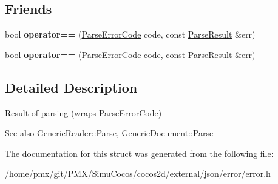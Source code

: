 \subsection*{Friends}
\begin{DoxyCompactItemize}
\item 
\mbox{\label{structParseResult_a58c9982e833d1c74686506ac7449200c}} 
bool {\bfseries operator==} (\hyperlink{group__RAPIDJSON__ERRORS_ga8d4b32dfc45840bca189ade2bbcb6ba7}{Parse\+Error\+Code} code, const \hyperlink{structParseResult}{Parse\+Result} \&err)
\item 
\mbox{\label{structParseResult_a58c9982e833d1c74686506ac7449200c}} 
bool {\bfseries operator==} (\hyperlink{group__RAPIDJSON__ERRORS_ga8d4b32dfc45840bca189ade2bbcb6ba7}{Parse\+Error\+Code} code, const \hyperlink{structParseResult}{Parse\+Result} \&err)
\end{DoxyCompactItemize}


\subsection{Detailed Description}
Result of parsing (wraps Parse\+Error\+Code) 


 \begin{DoxySeeAlso}{See also}
\hyperlink{classGenericReader_a0c450620d14ff1824e58bb7bd9b42099}{Generic\+Reader\+::\+Parse}, \hyperlink{classGenericDocument_aebd4e7fddd80c1e1174837aee6d2159b}{Generic\+Document\+::\+Parse} 
\end{DoxySeeAlso}


The documentation for this struct was generated from the following file\+:\begin{DoxyCompactItemize}
\item 
/home/pmx/git/\+P\+M\+X/\+Simu\+Cocos/cocos2d/external/json/error/error.\+h\end{DoxyCompactItemize}
